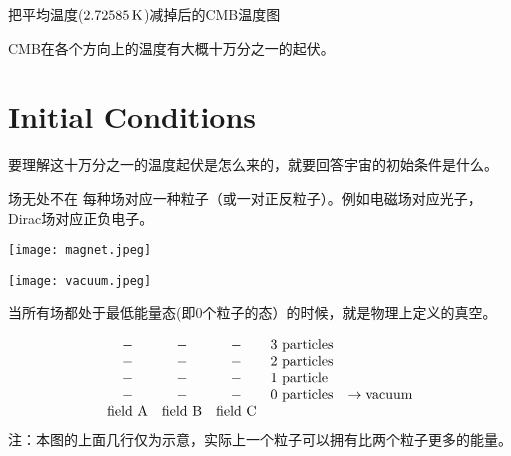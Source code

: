 \documentclass[CJK]{beamer}
\begin{document}
\begin{frame}
  \bch
  \ech
\end{frame}


\begin{frame}
  \bch
  \bcenter
  
  把平均温度($2.72585\,\mathrm{K}$)减掉后的CMB温度图
  \ecenter
  \ech
\end{frame}



\begin{frame}
  \bch
  CMB在各个方向上的温度有大概十万分之一的起伏。
  \ech
\end{frame}


\section{Initial Conditions}

\begin{frame}
  \bch
  {\large
  要理解这十万分之一的温度起伏是怎么来的，就要回答宇宙的初始条件是什么。}
  \ech
\end{frame}


\begin{frame}
\bch
\begin{minipage}{0.5\textwidth}
场无处不在
\skipline
每种场对应一种粒子（或一对正反粒子）。例如电磁场对应光子，Dirac场对应正负电子。
\end{minipage}
\begin{minipage}{0.4\textwidth}
\texttt{[image: magnet.jpeg]}
\end{minipage}
\ech
\end{frame}

\begin{frame}
\bch
\begin{minipage}{0.35\textwidth}
\texttt{[image: vacuum.jpeg]}
\end{minipage}\begin{minipage}{0.55\textwidth}
当所有场都处于最低能量态(即0个粒子的态）的时候，就是物理上定义的真空。
\end{minipage}

\skipline
\begin{equation}
\begin{array}{ccclr}
- & - & - & \mathrm{3\ particles} &\\
- & - & - & \mathrm{2\ particles}&\\
- & - & - & \mathrm{1\ particle} &\\
- & - & - & \mathrm{0\ particles}& \rightarrow {\bf \rm vacuum}\\ 
{\rm field\ A} & {\rm field\ B} & {\rm field\ C}
\end{array} \nonumber
\end{equation}
{\scriptsize
注：本图的上面几行仅为示意，实际上一个粒子可以拥有比两个粒子更多的能量。
}

\ech
\end{frame}
\end{document}
